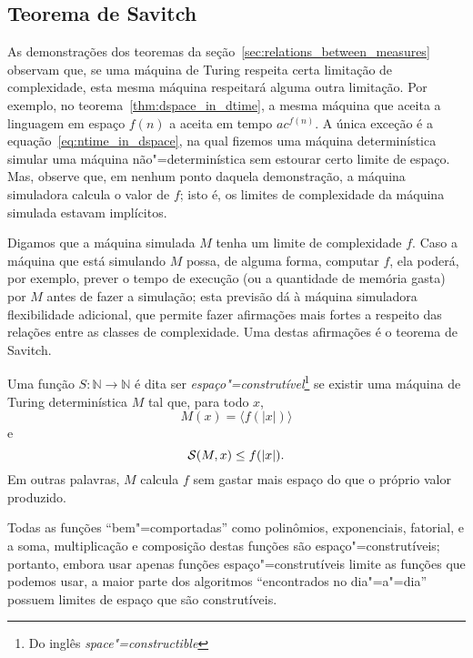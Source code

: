 \subsection{Teorema de Savitch}

As demonstrações dos teoremas da seção~\ref{sec:relations_between_measures}
observam que,
se uma máquina de Turing respeita certa limitação de complexidade,
esta mesma máquina respeitará alguma outra limitação.
Por exemplo, no teorema~\ref{thm:dspace_in_dtime},
a mesma máquina que aceita a linguagem em espaço $f(n)$
a aceita em tempo $a c^{f(n)}$.
A única exceção é a equação~\ref{eq:ntime_in_dspace},
na qual fizemos uma máquina determinística simular uma máquina não"=determinística
sem estourar certo limite de espaço.
Mas, observe que, em nenhum ponto daquela demonstração,
a máquina simuladora calcula o valor de $f$;
isto é, os limites de complexidade da máquina simulada estavam implícitos.

Digamos que a máquina simulada $M$ tenha um limite de complexidade $f$.
Caso a máquina que está simulando $M$ possa, de alguma forma,
computar $f$,
ela poderá, por exemplo,
prever o tempo de execução (ou a quantidade de memória gasta) por $M$
antes de fazer a simulação;
esta previsão dá à máquina simuladora flexibilidade adicional,
que permite fazer afirmações mais fortes
a respeito das relações entre as classes de complexidade.
Uma destas afirmações é o teorema de Savitch.

\begin{definition}
    Uma função $S: \mathbb N \to \mathbb N$
    é dita ser \emph{espaço"=construtível}\footnote{
        Do inglês \emph{space"=constructible}
    }
    se existir uma máquina de Turing determinística $M$
    tal que, para todo $x$,
    \begin{equation*}
        M(x) = \langle f(|x|) \rangle
    \end{equation*}
    e
    \begin{equation*}
        {\mathcal{S}}(M, x) \leq f(|x|).
    \end{equation*}
    Em outras palavras,
    $M$ calcula $f$
    sem gastar mais espaço do que o próprio valor produzido.
    \cite[p.~79]{AroraBarak2009}
\end{definition}

Todas as funções ``bem"=comportadas'' como polinômios,
exponenciais, fatorial, e a soma, multiplicação e composição destas funções
são espaço"=construtíveis;
portanto,
embora usar apenas funções espaço"=construtíveis limite
as funções que podemos usar,
a maior parte dos algoritmos ``encontrados no dia"=a"=dia''
possuem limites de espaço que são construtíveis.

